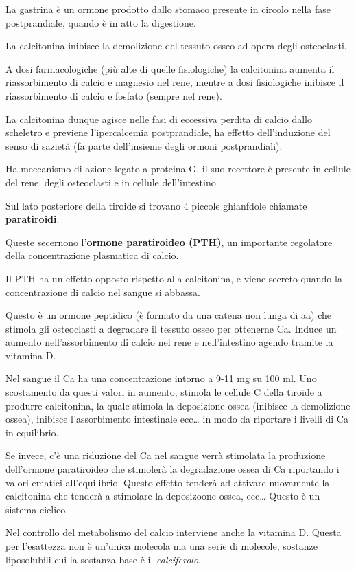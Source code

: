 \documentclass[]{article}
\begin{document}
La gastrina è un ormone prodotto dallo stomaco presente in circolo nella
fase postprandiale, quando è in atto la digestione.

La calcitonina inibisce la demolizione del tessuto osseo ad opera degli
osteoclasti.

A dosi farmacologiche (più alte di quelle fisiologiche) la calcitonina
aumenta il riassorbimento di calcio e magnesio nel rene, mentre a dosi
fisiologiche inibisce il riassorbimento di calcio e fosfato (sempre nel
rene).

La calcitonina dunque agisce nelle fasi di eccessiva perdita di calcio
dallo scheletro e previene l'ipercalcemia postprandiale, ha effetto
dell'induzione del senso di sazietà (fa parte dell'insieme degli ormoni
postprandiali).

Ha meccanismo di azione legato a proteina G. il suo recettore è presente
in cellule del rene, degli osteoclasti e in cellule dell'intestino.

Sul lato posteriore della tiroide si trovano 4 piccole ghianfdole
chiamate \textbf{paratiroidi}.

Queste secernono l'\textbf{ormone paratiroideo (PTH)}, un importante
regolatore della concentrazione plasmatica di calcio.

Il PTH ha un effetto opposto rispetto alla calcitonina, e viene secreto
quando la concentrazione di calcio nel sangue si abbassa.

Questo è un ormone peptidico (è formato da una catena non lunga di aa)
che stimola gli osteoclasti a degradare il tessuto osseo per ottenerne
Ca. Induce un aumento nell'assorbimento di calcio nel rene e
nell'intestino agendo tramite la vitamina D.

Nel sangue il Ca ha una concentrazione intorno a 9-11 mg su 100 ml. Uno
scostamento da questi valori in aumento, stimola le cellule C della
tiroide a produrre calcitonina, la quale stimola la deposizione ossea
(inibisce la demolizione ossea), inibisce l'assorbimento intestinale
ecc\ldots{} in modo da riportare i livelli di Ca in equilibrio.

Se invece, c'è una riduzione del Ca nel sangue verrà stimolata la
produzione dell'ormone paratiroideo che stimolerà la degradazione ossea
di Ca riportando i valori ematici all'equilibrio. Questo effetto tenderà
ad attivare nuovamente la calcitonina che tenderà a stimolare la
deposizoone ossea, ecc\ldots{} Questo è un sistema ciclico.

Nel controllo del metabolismo del calcio interviene anche la vitamina D.
Questa per l'esattezza non è un'unica molecola ma una serie di molecole,
sostanze liposolubili cui la sostanza base è il \emph{calciferolo}.
\end{document}
